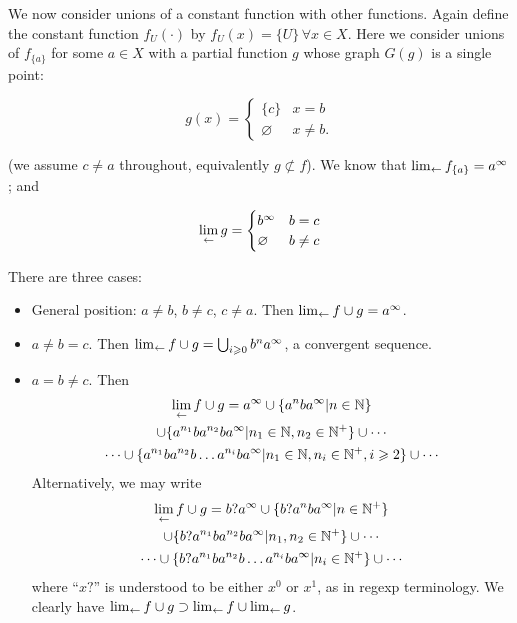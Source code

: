 \documentclass{article}
\theoremstyle{definition}
\let\emptyset\varnothing
\begin{document}
We now consider unions of a constant function with other functions.
Again define the constant function $f_{U}(\cdot)$ by $f_U(x)=\lbrace
U\rbrace\,\forall x\in X$.  Here we consider unions of $f_{\lbrace
  a\rbrace}$ for some $a\in X$ with a partial function $g$ whose graph
$G(g)$ is a single point:

\begin{equation}
  g(x) = \begin{cases}
    \lbrace c\rbrace & x=b\\
    \emptyset & x\neq b.
    \end{cases}
\end{equation}

(we assume $c\neq a$ throughout, equivalently $g\not\subset f$).  We
know that $\lim_{\leftarrow} f_{\lbrace a\rbrace}=a^\infty$; and

\begin{equation}
  \invlim{g}=\begin{cases}
  b^\infty & b=c\\
  \emptyset &b\neq c
  \end{cases}
\end{equation}


There are three cases:

\begin{itemize}
\item General position: $a\neq b$, $b\neq c$, $c\neq a$.  Then
  $\lim_{\leftarrow} f\cup g=a^\infty$.
\item $a\neq b=c$.  Then $\lim_{\leftarrow} f\cup g=\bigcup_{i\geqslant
  0}b^na^\infty$, a convergent sequence.
\item $a=b\neq c$.  Then
  \begin{multline}
    \lim_{\leftarrow} f\cup g=
    a^\infty\cup
    \lbrace a^nba^\infty|n\in\mathbb{N}\rbrace\\
    \cup\lbrace a^{n_1}ba^{n_2}ba^\infty|n_1\in\mathbb{N},n_2\in\mathbb{N^+}\rbrace
    \cup\cdots\\
    \cdots\cup\lbrace a^{n_1}ba^{n_2}b\ldots a^{n_i}ba^\infty|n_1\in\mathbb{N},n_i\in\mathbb{N}^+,i\geqslant 2\rbrace
    \cup\cdots
  \end{multline}
  Alternatively, we may write
  \begin{multline}
    \lim_{\leftarrow} f\cup g=
    b?a^\infty\cup
    \lbrace b?a^nba^\infty|n\in\mathbb{N^+}\rbrace\\
    \cup\lbrace b?a^{n_1}ba^{n_2}ba^\infty|n_1,n_2\in\mathbb{N^+}\rbrace
    \cup\cdots\\
    \cdots\cup\lbrace b?a^{n_1}ba^{n_2}b\ldots a^{n_i}ba^\infty|n_i\in\mathbb{N}^+\rbrace\cup\cdots
  \end{multline}
  where ``$x?$'' is understood to be either $x^0$ or $x^1$, as in regexp terminology.
  We clearly have $\lim_{\leftarrow} f\cup g\supset\lim_{\leftarrow} f\cup\lim_{\leftarrow} g$.
\end{itemize}
\end{document}
